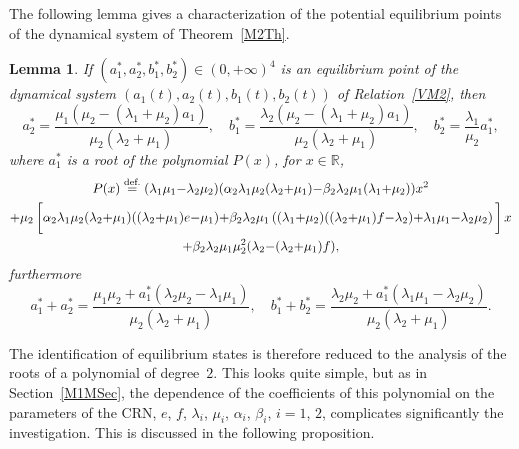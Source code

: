 \documentclass[english]{amsart}
\newcommand{\R}{\ensuremath{\mathbb{R}}}
\newcommand\steq[1]{\stackrel{\text{\rm #1.}}{=}}
\newtheorem{lemma}[proposition]{Lemma}
\numberwithin{proposition}{section}
\begin{document}
The following lemma gives a characterization of the potential equilibrium points of the dynamical system of Theorem~\eqref{M2Th}. 
\begin{lemma}
If $(a_1^*,a_2^*,b_1^*,b_2^*){\in}(0,{+}\infty)^4$ is an equilibrium point of the  dynamical system  $(a_1(t),a_2(t),b_1(t),b_2(t))$ of Relation~\eqref{VM2}, then
\begin{equation}\label{abb}
a_2^*=\frac{\mu_1  \left(\mu_2 -(\lambda_1  + \mu_2)a_1   \right)}{\mu_2  \left(\lambda_2  +\mu_1  \right)},
\quad b^*_1=\frac{\lambda_2  \left(\mu_2-(\lambda_1 +\mu_2)a_1 \right)}{\mu_2  \left(\lambda_2  +\mu_1  \right)},\quad
b_2^*=\frac{\lambda_1}{\mu_2} a_1^*,
\end{equation}
where $a_1^*$ is a  root of the polynomial $P(x)$, for $x{\in}\R$, 
\begin{multline}\label{PolyP}
P(x)\steq{def}  (\lambda_1\mu_1{-}\lambda_2\mu_2)(\alpha_2\lambda_1\mu_2 (\lambda_2{+}\mu_1){-}\beta_2\lambda_2\mu_1(\lambda_1{+}\mu_2))x^2\\
{+}\mu_2\left[\rule{0mm}{5mm}\alpha_2\lambda_1\mu_2(\lambda_2{+}\mu_1)((\lambda_2{+}\mu_1)e{-}\mu_1){+}\beta_2\lambda_2\mu_1\left((\lambda_1{+}\mu_2)((\lambda_2{+}\mu_1)f{-}\lambda_2){+}\lambda_1\mu_1{-}\lambda_2\mu_2\right)\rule{0mm}{5mm}\right]x\\
  +\beta_2  \lambda_2  \mu_1 \mu_2^{2} (\lambda_2{-}(\lambda_2{+}\mu_1)f),
\end{multline}
furthermore
\begin{equation}\label{sumC}
a_1^*+a_2^*=\frac{\mu_1\mu_2+a_1^*(\lambda_2\mu_2-\lambda_1\mu_1)}{\mu_2 (\lambda_2  +\mu_1)},\quad
b_1^*+b_2^*=\frac{\lambda_2  \mu_2+a_1^*(\lambda_1\mu_1-\lambda_2\mu_2)}{\mu_2  \left(\lambda_2  +\mu_1  \right)}.
\end{equation}
\end{lemma}
The identification of equilibrium states is therefore reduced to the analysis of the roots of  a polynomial of degree~$2$. This looks quite simple, but as in Section~\ref{M1MSec},  the dependence of the coefficients of this polynomial on the parameters of the CRN, $e$, $f$, $\lambda_i$, $\mu_i$, $\alpha_i$, $\beta_i$, $i{=}1$, $2$, complicates significantly the investigation. This is discussed in the following proposition. 
\end{document}

